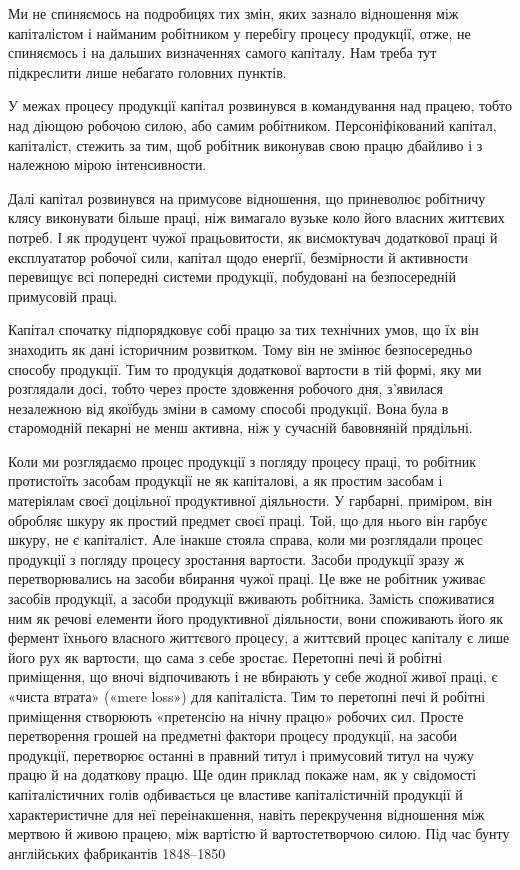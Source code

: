 
Ми не спиняємось на подробицях тих змін, яких зазнало відношення
між капіталістом і найманим робітником у перебігу
процесу продукції, отже, не спиняємось і на дальших визначеннях
самого капіталу. Нам треба тут підкреслити лише небагато головних
пунктів.

У межах процесу продукції капітал розвинувся в командування
над працею, тобто над діющою робочою силою, або самим робітником.
Персоніфікований капітал, капіталіст, стежить за тим, щоб
робітник виконував свою працю дбайливо і з належною мірою
інтенсивности.

Далі капітал розвинувся на примусове відношення, що приневолює
робітничу клясу виконувати більше праці, ніж вимагало
вузьке коло його власних життєвих потреб. І як продуцент чужої
працьовитости, як висмоктувач додаткової праці й експлуататор
робочої сили, капітал щодо енерґії, безмірности й активности
перевищує всі попередні системи продукції, побудовані на безпосередній
примусовій праці.

Капітал спочатку підпорядковує собі працю за тих технічних
умов, що їх він знаходить як дані історичним розвитком. Тому він
не змінює безпосередньо способу продукції. Тим то продукція
додаткової вартости в тій формі, яку ми розглядали досі, тобто
через просте здовження робочого дня, з’явилася незалежною від
якоїбудь зміни в самому способі продукції. Вона була в старомодній
пекарні не менш активна, ніж у сучасній бавовняній прядільні.

Коли ми розглядаємо процес продукції з погляду процесу
праці, то робітник протистоїть засобам продукції не як капіталові,
а як простим засобам і матеріялам своєї доцільної продуктивної
діяльности. У гарбарні, приміром, він обробляє шкуру як простий
предмет своєї праці. Той, що для нього він гарбує шкуру, не є
капіталіст. Але інакше стояла справа, коли ми розглядали процес
продукції з погляду процесу зростання вартости. Засоби продукції
зразу ж перетворювались на засоби вбирання чужої праці. Це
вже не робітник уживає засобів продукції, а засоби продукції
вживають робітника. Замість споживатися ним як речові елементи
його продуктивної діяльности, вони споживають його як
фермент їхнього власного життєвого процесу, а життєвий процес
капіталу є лише його рух як вартости, що сама з себе зростає.
Перетопні печі й робітні приміщення, що вночі відпочивають
і не вбирають у себе жодної живої праці, є «чиста втрата» («mere
loss») для капіталіста. Тим то перетопні печі й робітні приміщення
створюють «претенсію на нічну працю» робочих сил. Просте
перетворення грошей на предметні фактори процесу продукції,
на засоби продукції, перетворює останні в правний титул і примусовий
титул на чужу працю й на додаткову працю. Ще один
приклад покаже нам, як у свідомості капіталістичних голів одбивається
це властиве капіталістичній продукції й характеристичне
для неї переінакшення, навіть перекручення відношення між
мертвою й живою працею, між вартістю й вартостетворчою
силою. Під час бунту англійських фабрикантів 1848--1850~
\parbreak{}  %
